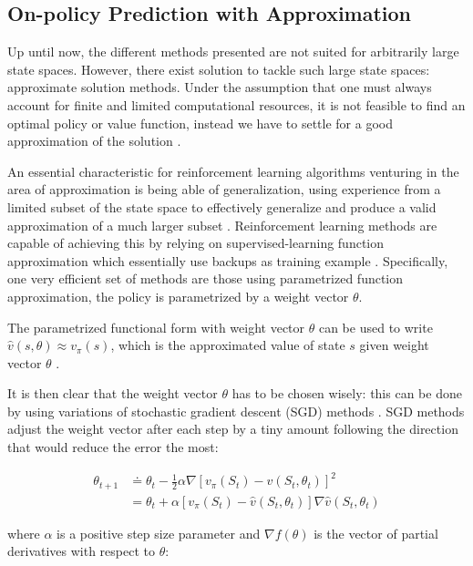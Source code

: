 \documentclass{seal_thesis}
\begin{document}
\subsection{On-policy Prediction with Approximation}

Up until now, the different methods presented are not suited for arbitrarily large state spaces. However, there exist solution to tackle such large state spaces: approximate solution methods. Under the assumption that one must always account for finite and limited computational resources, it is not feasible to find an optimal policy or value function, instead we have to settle for a good approximation of the solution \cite[p. 189]{Sutton1998}.

An essential characteristic for reinforcement learning algorithms venturing in the area of approximation is being able of generalization, \ie using experience from a limited subset of the state space to effectively generalize and produce a valid approximation of a much larger subset  \cite[p. 189]{Sutton1998}. Reinforcement learning methods are capable of achieving this by relying on supervised-learning function approximation which essentially use backups as training example \cite[p. 222]{Sutton1998}. Specifically, one very efficient set of methods are those using parametrized function approximation, \ie the policy is parametrized by a weight vector $\theta$.

The parametrized functional form with weight vector $\theta$ can be used to write $\hat{v}(s,\theta) \approx v_\pi (s)$, which is the approximated value of state $s$ given weight vector $\theta$ \cite[p. 191]{Sutton1998}.

It is then clear that the weight vector $\theta$ has to be chosen wisely: this can be done by using variations of stochastic gradient descent (SGD) methods \cite[p. 223]{Sutton1998}. SGD methods adjust the weight vector after each step by a tiny amount following the direction that would reduce the error the most:

\begin{align}
	\theta_{t+1} &\doteq \theta_t - \frac{1}{2} \alpha \nabla [v_\pi (S_t) - \hat{v} (S_t,\theta_t)]^2\\
	&= \theta_t + \alpha  [v_\pi (S_t) - \hat{v} (S_t,\theta_t)] \nabla \hat{v} (S_t,\theta_t)
\end{align}

where $\alpha$ is a positive step size parameter and $\nabla f(\theta)$ is the vector of partial derivatives with respect to $\theta$:
\end{document}
